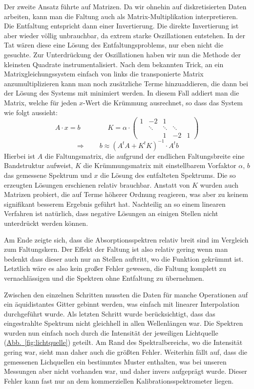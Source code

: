 \documentclass[11pt]{scrartcl}
\newcommand{\hypref}[2]{\hyperref[#2]{{#1}~\ref{#2}}}
\begin{document}
Der zweite Ansatz führte auf Matrizen.
Da wir ohnehin auf diskretisierten Daten arbeiten, kann man die Faltung auch als Matrix-Multiplikation interpretieren.
Die Entfaltung entspricht dann einer Invertierung.
Die direkte Invertierung ist aber wieder völlig unbrauchbar, da extrem starke Oszillationen entstehen.
In der Tat wären diese eine Lösung des Entfaltungsproblems, nur eben nicht die gesuchte.
Zur Unterdrückung der Oszillationen haben wir nun die Methode der kleinsten Quadrate instrumentalisiert.
Nach dem bekannten Trick, an ein Matrixgleichungssystem einfach von links die transponierte Matrix anzumultiplizieren kann man noch zusätzliche Terme hinzuaddieren, die dann bei der Lösung des Systems mit minimiert werden.
In diesem Fall addiert man die Matrix, welche für jeden $x$-Wert die Krümmung ausrechnet, so dass das System wie folgt aussieht:
\begin{equation}
A\cdot x = b
\qquad\qquad
K = \alpha\cdot
\begin{pmatrix} 
  1 &	-2 &	1 &	&	\\
  &	\ddots&	\ddots&	\ddots&	\\
  &	&	1 &	-2 &	1
\end{pmatrix} 
\end{equation}
\begin{equation}
\Rightarrow\qquad
b \approx (A^t A + K^t K)^{-1}\cdot  A^t b
\end{equation}
Hierbei ist $A$ die Faltungsmatrix, die aufgrund der endlichen Faltungsbreite eine Bandstruktur aufweist, $K$ die Krümmungsmatrix mit einstellbarem Vorfaktor $\alpha$, $b$ das gemessene Spektrum und $x$ die Lösung des entfalteten Spektrums.
Die so erzeugten Lösungen erschienen relativ brauchbar.
Anstatt von $K$ wurden auch Matrizen probiert, die auf Terme höherer Ordnung reagieren, was aber zu keinem signifikant besserem Ergebnis geführt hat.
Nachteilig an so einem linearen Verfahren ist natürlich, dass negative Lösungen an einigen Stellen nicht unterdrückt werden können.

Am Ende zeigte sich, dass die Absorptionsspektren relativ breit sind im Vergleich zum Faltungskern.
Der Effekt der Faltung ist also relativ gering wenn man bedenkt dass dieser auch nur an Stellen auftritt, wo die Funktion gekrümmt ist.
Letztlich wäre es also kein großer Fehler gewesen, die Faltung komplett zu vernachlässigen und die Spektren ohne Entfaltung zu übernehmen.

Zwischen den einzelnen Schritten mussten die Daten für manche Operationen auf ein äquidistantes Gitter gebinnt werden, was einfach mit linearer Interpolation durchgeführt wurde.
Als letzten Schritt wurde berücksichtigt, dass das eingestrahlte Spektrum nicht gleichhell in allen Wellenlängen war.
Die Spektren wurden nun einfach noch durch die Intensität der jeweiligen Lichtquelle (\hypref{Abb.}{fig:lichtquelle}) geteilt.
Am Rand des Spektralbereichs, wo die Intensität gering war, sieht man daher auch die größten Fehler.
Weiterhin fällt auf, dass die gemessenen Lichquellen ein bestimmtes Muster enthalten, was bei unseren Messungen aber nicht vorhanden war, und daher invers aufgeprägt wurde.
Dieser Fehler kann fast nur an dem kommerziellen Kalibrations\-spektrometer liegen.
\end{document}
